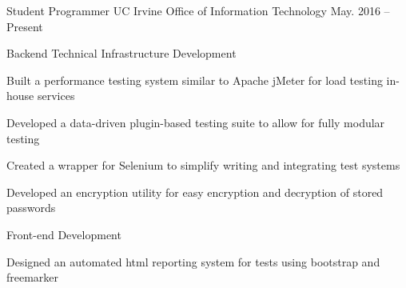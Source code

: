 

\begin{cventries}

  \cventry%
    {Student Programmer} %
    {UC Irvine Office of Information Technology} %
    {} %
    {May. 2016 -- Present} %
    {
      \begin{cvitems} %
        \item {Backend Technical Infrastructure Development}
          \vspace{1.5mm}
          \begin{cvitems}
            \item {Built a performance testing system similar to Apache jMeter for load testing %
            in-house services}
            \item {Developed a data-driven plugin-based testing suite to allow for fully modular %
            testing}
            \item {Created a wrapper for Selenium to simplify writing and integrating test %
            systems}
            \item {Developed an encryption utility for easy encryption and decryption of stored %
            passwords}
          \end{cvitems}
        \vspace{2.0mm}
        \item {Front-end Development}
          \vspace{1.5mm}
          \begin{cvitems}
            \item {Designed an automated html reporting system for tests using bootstrap and %
            freemarker}
          \end{cvitems}
      \end{cvitems}
    }


\end{cventries}
